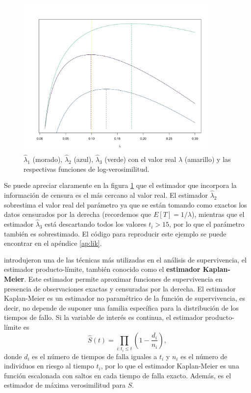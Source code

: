 \documentclass[11pt,a4paper]{article}
\begin{document}
\begin{figure}[htb]
\centering\includegraphics[width=10cm]{likelihood.png}
\caption{$\hat{\lambda}_1$ (morado), $\hat{\lambda}_2$ (azul), $\hat{\lambda}_3$ (verde) con el valor real $\lambda$ (amarillo) y las respectivas funciones de log-verosimilitud.}
\label{fig:lik}
\end{figure}



Se puede apreciar claramente en la figura \ref{fig:lik} que el estimador que incorpora la información de censura es el más cercano al valor real. El estimador $\hat{\lambda}_2$ sobrestima el valor real del parámetro ya que se están tomando como exactos los datos censurados por la derecha (recordemos que $E[T] = 1/\lambda$), mientras que el estimador $\hat{\lambda}_3$ está descartando todos los valores $t_i > 15$, por lo que el parámetro también es sobrestimado. El código para reproducir este ejemplo se puede encontrar en el apéndice \ref{ap:lik}.

\citet{kaplan-meier} introdujeron una de las técnicas más utilizadas en el análisis de supervivencia, el estimador producto-límite, también conocido como el \textbf{estimador Kaplan-Meier}. Este estimador permite aproximar funciones de supervivencia en presencia de observaciones exactas y censuradas por la derecha. El estimador Kaplan-Meier es un estimador no paramétrico de la función de supervivencia, es decir, no depende de suponer una familia específica para la distribución de los tiempos de fallo. Si la variable de interés es continua, el estimador producto-límite es
\begin{equation}
\label{eq:km}
\hat{S}(t) = \prod_{i: t_i \leq t} \left( 1-\frac{d_i}{n_i}\right),
\end{equation}
donde $d_i$ es el número de tiempos de falla iguales a $t_i$ y $n_i$ es el número de individuos en riesgo al tiempo $t_i$, por lo que el estimador Kaplan-Meier es una función escalonada con saltos en cada tiempo de falla exacto. Además, es el estimador de máxima verosimilitud para $S$.
\end{document}
